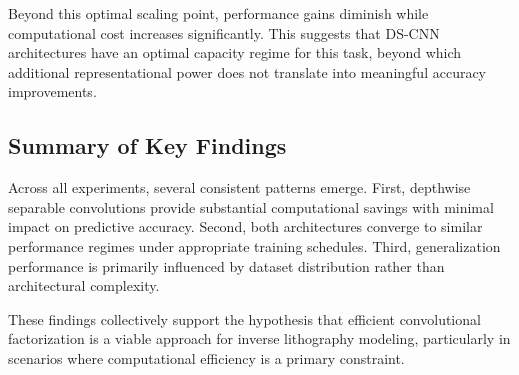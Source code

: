 \documentclass[conference]{IEEEtran}
\begin{document}
\vspace{0.5em}
\begin{table}[h]
\centering
\caption{Width scaling performance comparison across DS-CNN variants. The results show a clear efficiency--accuracy trade-off, where moderate width scaling (1.5$\times$) provides the best Pareto-optimal balance between accuracy and computational cost.}
\label{tab:width_scaling}

\end{table}





Beyond this optimal scaling point, performance gains diminish while computational cost increases significantly. This suggests that DS-CNN architectures have an optimal capacity regime for this task, beyond which additional representational power does not translate into meaningful accuracy improvements.

\subsection{\textbf{Summary of Key Findings}}

Across all experiments, several consistent patterns emerge. First, depthwise separable convolutions provide substantial computational savings with minimal impact on predictive accuracy. Second, both architectures converge to similar performance regimes under appropriate training schedules. Third, generalization performance is primarily influenced by dataset distribution rather than architectural complexity.

These findings collectively support the hypothesis that efficient convolutional factorization is a viable approach for inverse lithography modeling, particularly in scenarios where computational efficiency is a primary constraint.
\end{document}

